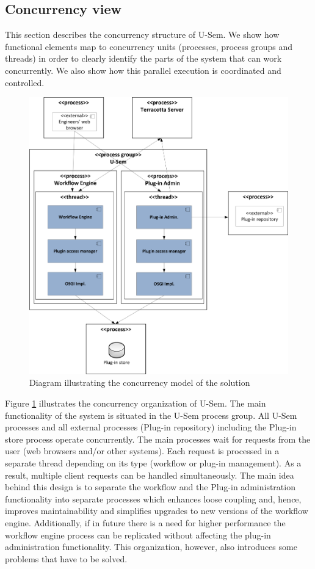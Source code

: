 \subsection{Concurrency view}
\label{sec:pluginConcur}

This section describes the concurrency structure of U-Sem. We show how functional elements map to concurrency units (processes, process groups and threads) in order to clearly identify the parts of the system that can work concurrently. We also show how this parallel execution is coordinated and controlled.

\begin{figure}[h!]
  \centering
  	\includegraphics[scale=0.70]{plug-in/layers/concur.png}
  \caption{Diagram illustrating the concurrency model of the solution}
  \label{fig_conc}
\end{figure}

Figure \ref{fig_conc} illustrates the concurrency organization of U-Sem. The main functionality of the system is situated in the U-Sem process group. All U-Sem processes and all external processes (Plug-in repository) including the Plug-in store process operate concurrently. The main processes wait for requests from the user (web browsers and/or other systems). Each request is processed in a separate thread depending on its type (workflow or plug-in management). As a result, multiple client requests can be handled simultaneously. The main idea behind this design is to separate the workflow and the Plug-in administration functionality into separate processes which enhances loose coupling and, hence, improves maintainability and simplifies upgrades to new versions of the workflow engine. Additionally, if in future there is a need for higher performance the workflow engine process can be replicated without affecting the plug-in administration functionality. This organization, however, also introduces some problems that have to be solved.

